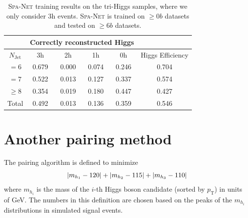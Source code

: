 \documentclass[12pt]{article}
\begin{document}
    \begin{table}[htpb]
        \centering
        \caption{\textsc{Spa-Net} training results on the tri-Higgs samples, where we only consider 3h events. \textsc{Spa-Net} is trained on $\ge 0b$ datasets and tested on $\ge 6b$ datasets.}
        \label{tab:SPANet_triHiggs_6b_3h}
        \begin{tabular}{c|cccc|c}
            \multicolumn{1}{l|}{} & \multicolumn{4}{c|}{Correctly reconstructed Higgs} & \multicolumn{1}{l}{} \\ \hline
            $N_\text{Jet}$        & 3h          & 2h         & 1h         & 0h         & Higgs Efficiency     \\ \hline
            $=6$                  & 0.679       & 0.000      & 0.074      & 0.246      & 0.704                \\
            $=7$                  & 0.522       & 0.013      & 0.127      & 0.337      & 0.574                \\
            $\ge 8$               & 0.354       & 0.019      & 0.180      & 0.447      & 0.427                \\ \hline
            Total                 & 0.492       & 0.013      & 0.136      & 0.359      & 0.546
        \end{tabular}
    \end{table}
\section{Another pairing method}%
\label{sec:another_pairing_method}
    The pairing algorithm is defined to minimize
    \begin{equation}\label{eq:pairing_method_abs}
        \abs{m_{h_1} - 120} + \abs{m_{h_2} - 115} + \abs{m_{h_3} - 110}
    \end{equation}
    where $m_{h_i}$ is the mass of the $i$-th Higgs boson candidate (sorted by $p_{\text{T}}$) in units of GeV. The numbers in this definition are chosen based on the peaks of the $m_{h_i}$ distributions in simulated signal events.
\end{document}
